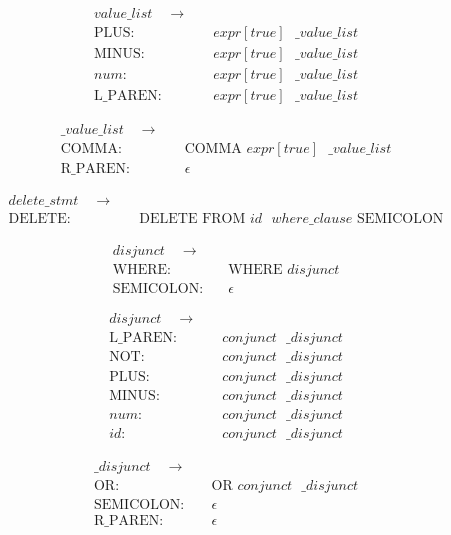 \documentclass{article}
\begin{document}
\begin{align*}
value\_list \quad  \to & \quad\\
\text{PLUS}: & \quad expr[true] \text{ } \_value\_list \\
\text{MINUS}: & \quad expr[true] \text{ } \_value\_list \\
num: & \quad expr[true] \text{ } \_value\_list \\
\text{L\_PAREN}: & \quad expr[true] \text{ } \_value\_list
\end{align*}

\begin{align*}
\_value\_list \quad  \to & \quad\\
\text{COMMA}: & \quad \text{COMMA } expr[true] \text{ } \_value\_list \\
\text{R\_PAREN}: & \quad \epsilon
\end{align*}

\begin{align*}
delete\_stmt \quad  \to & \quad\\
\text{DELETE}: & \quad \text{DELETE FROM } id \text{ } where\_clause \text{ SEMICOLON}
\end{align*}


\begin{align*}
disjunct \quad  \to & \quad\\
\text{WHERE}: & \quad \text{WHERE } disjunct\\
\text{SEMICOLON}: & \quad \epsilon
\end{align*}

\begin{align*}
disjunct \quad  \to & \quad\\
\text{L\_PAREN}: & \quad conjunct \text{ } \_disjunct \\
\text{NOT}: & \quad conjunct \text{ } \_disjunct \\
\text{PLUS}: & \quad conjunct \text{ } \_disjunct \\
\text{MINUS}: & \quad conjunct \text{ } \_disjunct \\
num: & \quad conjunct \text{ } \_disjunct \\
id: & \quad conjunct \text{ } \_disjunct
\end{align*}

\begin{align*}
\_disjunct \quad  \to & \quad\\
\text{OR}: & \quad \text{OR } conjunct \text{ } \_disjunct\\
\text{SEMICOLON}: & \quad \epsilon \\
\text{R\_PAREN}: & \quad \epsilon
\end{align*}
\end{document}
